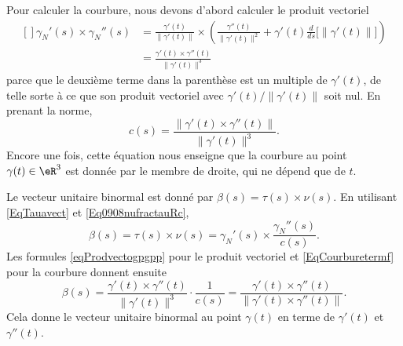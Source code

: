 Pour calculer la courbure, nous devons d'abord calculer le produit vectoriel
\begin{equation}        \label{eqProdvectogpgpp}
    \begin{aligned}[]
        \gamma_N'(s)\times \gamma_N''(s) &=  \frac{ \gamma'(t) }{ \| \gamma'(t) \| }\times \left( \frac{ \gamma''(t) }{ \| \gamma'(t) \|^2 }+\gamma'(t)\frac{ d }{ ds }\Big[ \| \gamma'(t) \| \Big] \right)\\
        &=\frac{ \gamma'(t)\times \gamma''(t) }{ \| \gamma'(t) \|^3 }
    \end{aligned}
\end{equation}
parce que le deuxième terme dans la parenthèse est un multiple de $\gamma'(t)$, de telle sorte à ce que son produit vectoriel avec $\gamma'(t)/\| \gamma'(t) \|$ soit nul. En prenant la norme,
\begin{equation}        \label{EqCourburetermf}
    c(s)=\frac{ \| \gamma'(t)\times \gamma''(t) \| }{ \| \gamma'(t) \|^3 }.
\end{equation}
Encore une fois, cette équation nous enseigne que la courbure au point $\gamma(t)\in\eR^3$ est donnée par le membre de droite, qui ne dépend que de $t$.

Le vecteur unitaire binormal est donné par $\beta(s)=\tau(s)\times \nu(s)$. En utilisant \eqref{EqTauavect} et \eqref{Eq0908nufractauRc},
\begin{equation}
    \beta(s)=\tau(s)\times\nu(s)=\gamma_N'(s)\times \frac{ \gamma_N''(s) }{ c(s) }.
\end{equation}
Les formules \eqref{eqProdvectogpgpp} pour le produit vectoriel et \eqref{EqCourburetermf} pour la courbure donnent ensuite
\begin{equation}
    \beta(s)=\frac{ \gamma'(t)\times \gamma''(t) }{ \| \gamma'(t) \|^3 }\cdot\frac{1}{ c(s) }=\frac{ \gamma'(t)\times \gamma''(t) }{ \|  \gamma'(t)\times \gamma''(t)  \| }.
\end{equation}
Cela donne le vecteur unitaire binormal au point $\gamma(t)$ en terme de $\gamma'(t)$ et $\gamma''(t)$.

